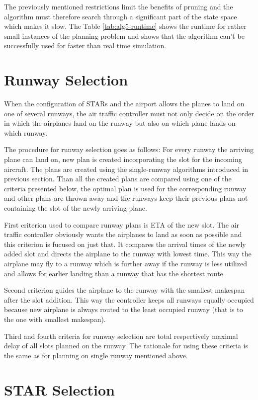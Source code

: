 The previously mentioned restrictions limit the benefits of pruning and the algorithm must therefore search through a significant part of the state space which makes it slow. The Table \ref{tab:alg5-runtime} shows the runtime for rather small instances of the planning problem and shows that the algorithm can't be successfully used for faster than real time simulation.

\section{Runway Selection}

When the configuration of STARs and the airport allows the planes to land on one of several runways, the air traffic controller must not only decide on the order in which the airplanes land on the runway but also on which plane lands on which runway.

The procedure for runway selection goes as follows: For every runway the arriving plane can land on, new plan is created incorporating the slot for the incoming aircraft. The plans are created using the single-runway algorithms introduced in previous section. Than all the created plans are compared using one of the criteria presented below, the optimal plan is used for the corresponding runway and other plans are thrown away and the runways keep their previous plans not containing the slot of the newly arriving plane.

First criterion used to compare runway plans is ETA of the new slot. The air traffic controller obviously wants the airplanes to land as soon as possible and this criterion is fucused on just that. It compares the arrival times of the newly added slot and directs the airplane to the runway with lowest time. This way the airplane may fly to a runway which is further away if the runway is less utilized and allows for earlier landing than a runway that has the shortest route.

Second criterion guides the airplane to the runway with the smallest makespan after the slot addition. This way the controller keeps all runways equally occupied because new airplane is always routed to the least occupied runway (that is to the one with smallest makespan).

Third and fourth criteria for runway selection are total respectively maximal delay of all slots planned on the runway. The rationale for using these criteria is the same as for planning on single runway mentioned above.

\section{STAR Selection}

